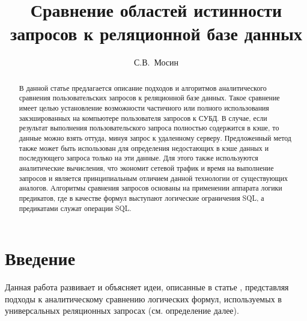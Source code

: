 \documentclass{cmi}
\begin{document}
\author{С.В.~Мосин}
\title{Сравнение областей истинности запросов к реляционной базе данных}


\maketitle{}

\begin{abstract}%
В данной статье предлагается описание подходов и алгоритмов аналитического сравнения пользовательских
запросов к реляционной базе данных. Такое сравнение имеет целью установление возможности частичного или
полного использования закэшированных на компьютере пользователя запросов к СУБД. В случае, если результат
выполнения пользовательского запроса полностью содержится в кэше, то данные можно взять оттуда, минуя
запрос к удаленному серверу. Предложенный метод также может быть использован для определения недостающих в
кэше данных и последующего запроса только на эти данные. Для этого также используются аналитические
вычисления, что экономит сетевой трафик и время на выполнение запросов и является принципиальным отличием
данной технологии от существующих аналогов. Алгоритмы сравнения запросов основаны на применении аппарата
логики предикатов, где в качестве формул выступают логические ограничения SQL, а предикатами служат операции
SQL.

\end{abstract}



\section*{Введение}
\label{sec-intro}
Данная работа развивает и объясняет идеи, описанные в статье \cite{mosin_zykin}, представляя подходы к аналитическому сравнению логических формул, используемых в универсальных реляционных запросах (см. определение далее).
\end{document}
